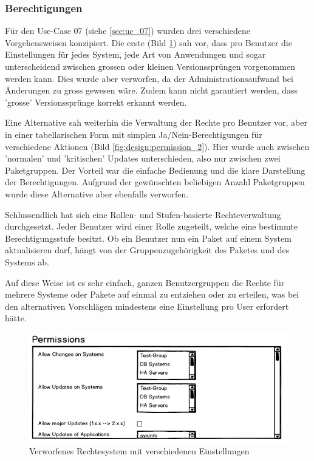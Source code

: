 \subsubsection*{Berechtigungen} \label{sec:design:permissions}

Für den Use-Case 07 (siehe \ref{sec:uc_07}) wurden drei verschiedene Vorgehensweisen konzipiert. Die erste (Bild \ref{fig:design:permission_1}) sah vor, dass pro Benutzer die Einstellungen für jedes System, jede Art von Anwendungen und sogar unterscheidend zwischen grossen oder kleinen Versionssprüngen vorgenommen werden kann. Dies wurde aber verworfen, da der Administrationsaufwand bei Änderungen zu gross gewesen wäre. Zudem kann nicht garantiert werden, dass 'grosse' Versionssprünge korrekt erkannt werden.

Eine Alternative sah weiterhin die Verwaltung der Rechte pro Benutzer vor, aber in einer tabellarischen Form mit simplen Ja/Nein-Berechtigungen für verschiedene Aktionen (Bild \ref{fig:design:permission_2}). Hier wurde auch zwischen 'normalen' und 'kritischen' Updates unterschieden, also nur zwischen zwei Paketgruppen. Der Vorteil war die einfache Bedienung und die klare Darstellung der Berechtigungen. Aufgrund der gewünschten beliebigen Anzahl Paketgruppen wurde diese Alternative aber ebenfalls verworfen.

Schlussendlich hat sich eine Rollen- und Stufen-basierte Rechteverwaltung durchgesetzt. Jeder Benutzer wird einer Rolle zugeteilt, welche eine bestimmte Berechtigungsstufe besitzt. Ob ein Benutzer nun ein Paket auf einem System aktualisieren darf, hängt von der Gruppenzugehörigkeit des Paketes und des Systems ab.

Auf diese Weise ist es sehr einfach, ganzen Benutzergruppen die Rechte für mehrere Systeme oder Pakete auf einmal zu entziehen oder zu erteilen, was bei den alternativen Vorschlägen mindestens eine Einstellung pro User erfordert hätte.

\begin{figure}[H]
	\centering
	\includegraphics[width=0.75\linewidth]{files/mockups/permission_1}
	\caption{Verworfenes Rechtesystem mit verschiedenen Einstellungen}
	\label{fig:design:permission_1}
\end{figure}

